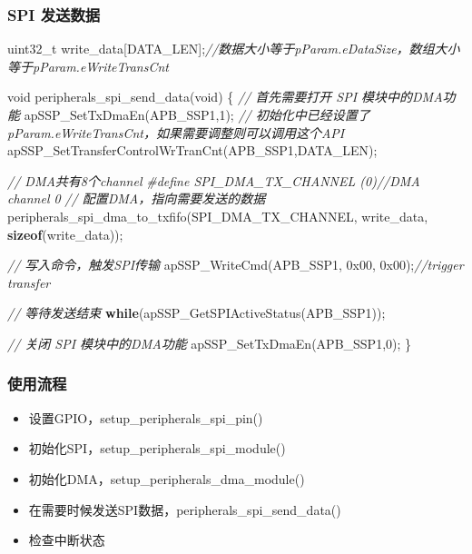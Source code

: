 \documentclass[
  12pt,
]{book}
\newenvironment{Shaded}{\begin{snugshade}}{\end{snugshade}}
\newcommand{\BaseNTok}[1]{\textcolor[rgb]{0.00,0.00,0.81}{#1}}
\newcommand{\CommentTok}[1]{\textcolor[rgb]{0.56,0.35,0.01}{\textit{#1}}}
\newcommand{\ControlFlowTok}[1]{\textcolor[rgb]{0.13,0.29,0.53}{\textbf{#1}}}
\newcommand{\DataTypeTok}[1]{\textcolor[rgb]{0.13,0.29,0.53}{#1}}
\newcommand{\DecValTok}[1]{\textcolor[rgb]{0.00,0.00,0.81}{#1}}
\newcommand{\KeywordTok}[1]{\textcolor[rgb]{0.13,0.29,0.53}{\textbf{#1}}}
\newcommand{\NormalTok}[1]{#1}
\newcommand{\PreprocessorTok}[1]{\textcolor[rgb]{0.56,0.35,0.01}{\textit{#1}}}
\providecommand{\tightlist}{%
  \setlength{\itemsep}{0pt}\setlength{\parskip}{0pt}}
\begin{document}
\hypertarget{spi-ux53d1ux9001ux6570ux636e-1}{%
\subsubsection{SPI 发送数据}\label{spi-ux53d1ux9001ux6570ux636e-1}}

\begin{Shaded}
\begin{Highlighting}[]
\DataTypeTok{uint32_t}\NormalTok{ write_data[DATA_LEN];}\CommentTok{//数据大小等于pParam.eDataSize，数组大小等于pParam.eWriteTransCnt}

\DataTypeTok{void}\NormalTok{ peripherals_spi_send_data(}\DataTypeTok{void}\NormalTok{)}
\NormalTok{\{}
  \CommentTok{// 首先需要打开 SPI 模块中的DMA功能}
\NormalTok{  apSSP_SetTxDmaEn(APB_SSP1,}\DecValTok{1}\NormalTok{);}
  \CommentTok{// 初始化中已经设置了pParam.eWriteTransCnt，如果需要调整则可以调用这个API}
\NormalTok{  apSSP_SetTransferControlWrTranCnt(APB_SSP1,DATA_LEN);}
  
  \CommentTok{// DMA共有8个channel}
  \PreprocessorTok{#define SPI_DMA_TX_CHANNEL   (0)}\CommentTok{//DMA channel 0}
  \CommentTok{// 配置DMA，指向需要发送的数据}
\NormalTok{  peripherals_spi_dma_to_txfifo(SPI_DMA_TX_CHANNEL, write_data, }\KeywordTok{sizeof}\NormalTok{(write_data));}
  
  \CommentTok{// 写入命令，触发SPI传输}
\NormalTok{  apSSP_WriteCmd(APB_SSP1, }\BaseNTok{0x00}\NormalTok{, }\BaseNTok{0x00}\NormalTok{);}\CommentTok{//trigger transfer}

  \CommentTok{// 等待发送结束}
  \ControlFlowTok{while}\NormalTok{(apSSP_GetSPIActiveStatus(APB_SSP1));}
  
  \CommentTok{// 关闭 SPI 模块中的DMA功能}
\NormalTok{  apSSP_SetTxDmaEn(APB_SSP1,}\DecValTok{0}\NormalTok{);}
\NormalTok{\}}
\end{Highlighting}
\end{Shaded}

\hypertarget{ux4f7fux7528ux6d41ux7a0b-12}{%
\subsubsection{使用流程}\label{ux4f7fux7528ux6d41ux7a0b-12}}

\begin{itemize}
\tightlist
\item
  设置GPIO，setup\_peripherals\_spi\_pin()
\item
  初始化SPI，setup\_peripherals\_spi\_module()
\item
  初始化DMA，setup\_peripherals\_dma\_module()
\item
  在需要时候发送SPI数据，peripherals\_spi\_send\_data()
\item
  检查中断状态
\end{itemize}
\end{document}
